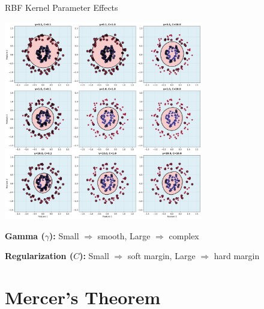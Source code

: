\documentclass[8pt,aspectratio=1610]{beamer}
\begin{document}
\begin{frame}{RBF Kernel Parameter Effects}
\begin{center}
\includegraphics[width=0.65\textwidth]{../figures/rbf_kernel_parameters.png}
\end{center}

\textbf{Gamma ($\gamma$):} Small $\Rightarrow$ smooth, Large $\Rightarrow$ complex

\textbf{Regularization ($C$):} Small $\Rightarrow$ soft margin, Large $\Rightarrow$ hard margin
\end{frame}

\section{Mercer's Theorem}
\end{document}
